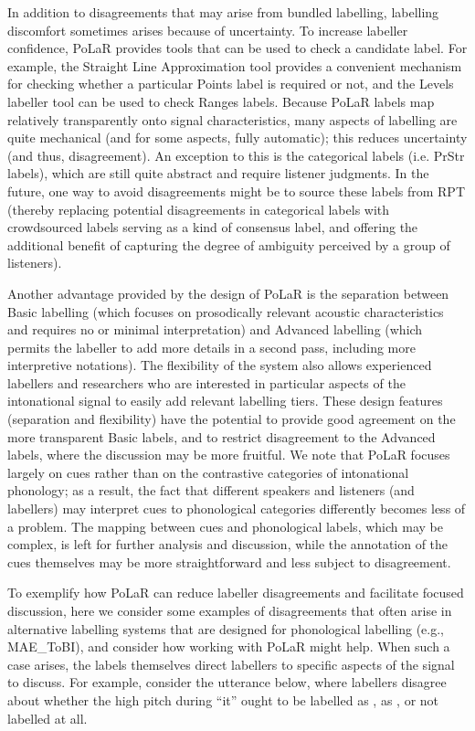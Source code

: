 \documentclass[11pt, twoside]{memoir}
\def\textlabel#1{{\relsize{-.5}\fontspec[Mapping=tex-text]{Roboto Mono}{#1}}}
\begin{document}
In addition to disagreements that may arise from bundled labelling, labelling discomfort sometimes arises because of uncertainty.  To increase labeller confidence, PoLaR provides tools that can be used to check a candidate label.  For example, the Straight Line Approximation tool provides a convenient mechanism for checking whether a particular Points label is required or not, and the Levels labeller tool can be used to check Ranges labels.  Because PoLaR labels map relatively transparently onto signal characteristics, many aspects of labelling are quite mechanical (and for some aspects, fully automatic); this reduces uncertainty (and thus, disagreement). An exception to this is the categorical labels (i.e. PrStr labels), which are still quite abstract and require listener judgments. In the future, one way to avoid disagreements might be to source these labels from RPT (thereby replacing potential disagreements in categorical labels with crowdsourced labels serving as a kind of consensus label, and offering the additional benefit of capturing the degree of ambiguity perceived by a group of listeners). 

Another advantage provided by the design of PoLaR is the separation between Basic labelling (which focuses on prosodically relevant acoustic characteristics and requires no or minimal interpretation) and Advanced labelling (which permits the labeller to add more details in a second pass, including more interpretive notations). The flexibility of the system also allows experienced labellers and researchers who are interested in particular aspects of the intonational signal to easily add relevant labelling tiers.  These design features (separation and flexibility) have the potential to provide good agreement on the more transparent Basic labels, and to restrict disagreement to the Advanced labels, where the discussion may be more fruitful.  We note that PoLaR focuses largely on cues rather than on the contrastive categories of intonational phonology; as a result, the fact that different speakers and listeners (and labellers) may interpret cues to phonological categories differently becomes less of a problem.  The mapping between cues and phonological labels, which may be complex, is left for further analysis and discussion, while the annotation of the cues themselves may be more straightforward and less subject to disagreement.

To exemplify how PoLaR can reduce labeller disagreements and facilitate focused discussion, here we consider some examples of disagreements that often arise in alternative labelling systems that are designed for phonological labelling (e.g., MAE\_ToBI), and consider how working with PoLaR might help. When such a case arises, the labels themselves direct labellers to specific aspects of the signal to discuss. For example, consider the utterance below, where labellers disagree about whether the high pitch during “it” ought to be labelled as \textlabel{H*}, as \textlabel{\%H}, or not labelled at all.
\end{document}
